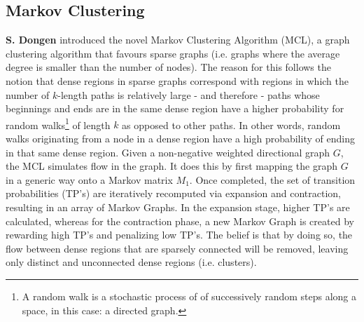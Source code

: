\documentclass[paper=a4,fontsize=11pt]{report}	%
\begin{document}
\subsection{Markov Clustering}
\textbf{S. Dongen} \cite{markov_clustering} introduced the novel Markov Clustering Algorithm (MCL), a graph clustering algorithm that favours sparse graphs (i.e. graphs where the average degree is smaller than the number of nodes). 
The reason for this follows the notion that dense regions in sparse graphs correspond with regions in which the number of $k$-length paths is relatively large - and therefore - paths whose beginnings and ends are in the same dense region have a higher probability for random walks\footnote{A random walk is a stochastic process of of successively random steps along a space, in this case: a directed graph.} of length $k$ as opposed to other paths.
In other words, random walks originating from a node in a dense region have a high probability of ending in that same dense region.
Given a non-negative weighted directional graph $G$, the MCL simulates flow in the graph. 
It does this by first mapping the graph $G$ in a generic way onto a Markov matrix $M_1$.
Once completed, the set of transition probabilities (TP's) are iteratively recomputed via expansion and contraction, resulting in an array of Markov Graphs.
In the expansion stage, higher TP's are calculated, whereas for the contraction phase, a new Markov Graph is created by rewarding high TP's and penalizing low TP's.
The belief is that by doing so, the flow between dense regions that are sparsely connected will be removed, leaving only distinct and unconnected dense regions (i.e. clusters).
\end{document}
